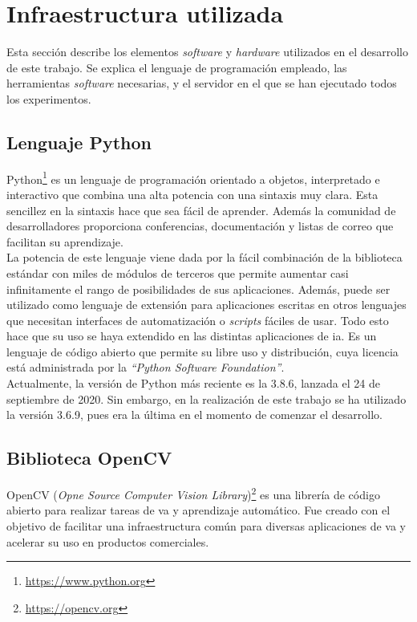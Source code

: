 \section{Infraestructura utilizada}
Esta sección describe los elementos \textit{software} y \textit{hardware} utilizados en el desarrollo de este trabajo. Se explica el lenguaje de programación empleado, las herramientas \textit{software} necesarias, y el servidor en el que se han ejecutado todos los experimentos.

\subsection{Lenguaje Python}
Python\footnote{\url{https://www.python.org}} es un lenguaje de programación orientado a objetos, interpretado e interactivo que combina una alta potencia con una sintaxis muy clara. Esta sencillez en la sintaxis hace que sea fácil de aprender. Además la comunidad de desarrolladores proporciona conferencias, documentación y listas de correo que facilitan su aprendizaje.\\

La potencia de este lenguaje viene dada por la fácil combinación de la biblioteca estándar con miles de módulos de terceros que permite aumentar casi infinitamente el rango de posibilidades de sus aplicaciones. Además, puede ser utilizado como lenguaje de extensión para aplicaciones escritas en otros lenguajes que necesitan interfaces de automatización o \textit{scripts} fáciles de usar. Todo esto hace que su uso se haya extendido en las distintas aplicaciones de \acrshort{ia}. Es un lenguaje de código abierto que permite su libre uso y distribución, cuya licencia está administrada por la \textit{``Python Software Foundation''}.\\

Actualmente, la versión de Python más reciente es la 3.8.6,  lanzada el 24 de septiembre de 2020. Sin embargo, en la realización de este trabajo se ha utilizado la versión 3.6.9, pues era la última en el momento de comenzar el desarrollo.

\subsection{Biblioteca OpenCV}
OpenCV (\textit{Opne Source Computer Vision Library})\footnote{\url{https://opencv.org}} es una librería de código abierto para realizar tareas de \acrshort{va} y aprendizaje automático. Fue creado con el objetivo de facilitar una infraestructura común para diversas aplicaciones de \acrshort{va} y acelerar su uso en productos comerciales.\\

